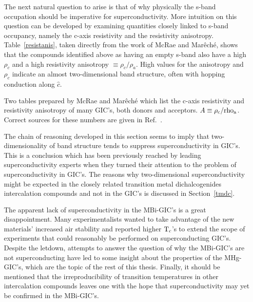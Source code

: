 	The next  natural question to  arise is that  of why physically the
s-band   occupation   should be  imperative    for superconductivity.  More
intuition on this question can be developed by examining quantities closely
linked to  s-band  occupancy, namely   the   c-axis   resistivity and   the
resistivity anisotropy.  Table~\ref{resistanis}, taken directly from the
work of McRae and Mar\^ech\'e\cite{mcrae88}, shows that the compounds
identified above as having an empty s-band also have a high $\rho_c$ and a
high resistivity anisotropy $\equiv \rho_c/\rho_a$.  High values for the
anisotropy and $\rho_c$ indicate an almost two-dimensional band structure,
often with hopping conduction along $\hat{c}$.\cite{R200,E343}

\begin{table}[p]
\caption[Resistivity anisotropy in selected GIC's]{Two tables prepared by McRae and Mar\^ech\'e\cite{mcrae88} which
list the c-axis resistivity and resistivity anisotropy of many GIC's, both
donors and acceptors.   $A\equiv \rm \rho_c/rho_a$.
  Correct sources for these numbers are given in Ref.~\cite{mcrae88}.}
\label{resistanis}
\end{table}

	The chain of  reasoning developed  in this section   seems to imply
that   two-dimensionality     of    band  structure    tends  to   suppress
superconductivity in GIC's.  This is a conclusion which has been previously
reached by leading superconductivity experts\cite{matthias71,hannay65} when
they turned their attention to the  problem  of superconductivity in GIC's.
The reasons why two-dimensional superconductivity might be  expected in the
closely related  transition metal dichalcogenides   intercalation compounds
and not in the GIC's is discussed in Section~\ref{tmdc}.

	The apparent lack of superconductivity in the  MBi-GIC's is a great
disappointment. Many experimentalists wanted  to take advantage  of the new
materials' increased air stability  and  reported  higher  $\rm   T_c$'s to
extend the scope  of  experiments that  could reasonably   be  performed on
superconducting  GIC's.  Despite  the  letdown,  attempts   to  answer  the
question  of  why the MBi-GIC's  are  not superconducting  have led to some
insight about the properties of the  MHg-GIC's, which are the  topic of the
rest  of  this   thesis.    Finally, it  should   be  mentioned   that  the
irreproducibility   of  transition  temperatures  in other    intercalation
compounds  leaves   one with the   hope that  superconductivity  may yet be
confirmed in the MBi-GIC's.
